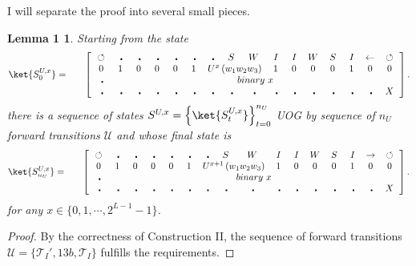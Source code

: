 \documentclass[11pt,letterpaper]{article}
\newtheorem*{lem1}{Lemma 1}
\newcommand{\<}{\langle}
\renewcommand{\>}{\rangle}
\newcommand{\tur}{\,\circlearrowleft\,}   %
\newcommand{\bul}{\:\:\centerdot\:}       %
\newcommand{\iga}{\:I\,}                  %
\newcommand{\wga}{W}						%
\newcommand{\sga}{\:S\,}					%
\begin{document}
\\
\\
I will separate the proof into several small pieces.
\begin{lem1}
	Starting from the state
	\begin{eqnarray}
		\ket{S^{U,x}_0} &=& \quad \left[ \begin{array}{cccccccccccccccc}
			\tur & \bul & 
			\bul & \bul & \bul & \bul & \bul & \sga & \wga & \iga & \iga & 
		\wga & \sga & \iga & \leftarrow & \tur
			\\		
			0    & 1    & 0    & 0    & 0    & 1    & 
			\multicolumn{3}{c}{U^{x}\left(w_1w_2w_3\right)}  &
			1    & 0    & 0    & 0    & 1    & 0 & 0
			\\
			\bul & \multicolumn{15}{c}{binary~x}
			\\
			\bul & \bul & \bul & \bul & \bul & \bul & \bul & \bul & \bul & \bul & \bul & \bul & \bul & \bul & \bul & X
	 	\end{array} \right]. \label{endstate}
	\end{eqnarray}
	there is a sequence of states $S^{U,x}=\left\{\ket{S^{U,x}_t}\right\}_{t= 0}^{n_{U}}$ UOG by sequence of $n_U$ forward transitions $\mathcal{U}$ and whose final state is
	\begin{eqnarray}
			\ket{S^{U,x}_{n_U}} &=& \quad \left[ \begin{array}{cccccccccccccccc}
				\tur & \bul & 
				\bul & \bul & \bul & \bul & \bul & \sga & \wga & \iga & \iga & 
			\wga & \sga & \iga & \rightarrow & \tur
				\\		
				0    & 1    & 0    & 0    & 0    & 1    & 
				\multicolumn{3}{c}{U^{x+1}\left(w_1w_2w_3\right)}  &
				1    & 0    & 0    & 0    & 1    & 0 & 0
				\\
				\bul & \multicolumn{15}{c}{binary~x}
				\\
				\bul & \bul & \bul & \bul & \bul & \bul & \bul & \bul & \bul & \bul & \bul & \bul & \bul & \bul & \bul & X
		 	\end{array} \right]. \label{endstate}
		\end{eqnarray}
	for any $x\in\{0,1,\cdots,2^{L-1}-1\}$.
\end{lem1}
\begin{proof}
By the correctness of Construction II, the sequence of forward transitions $\mathcal{U}=\{\mathcal{T}_I',13b,\mathcal{T}_I\}$ fulfills the requirements.
\end{proof}
\end{document}
